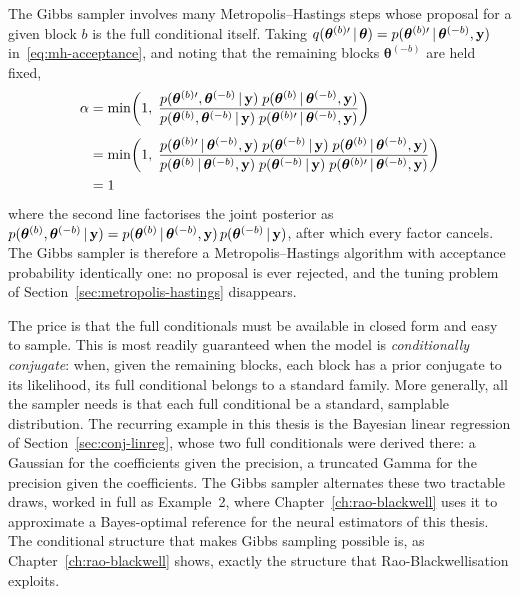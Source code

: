 The Gibbs sampler involves many Metropolis--Hastings steps whose proposal
for a given block $b$ is the full conditional itself. Taking
$q(\bm{\theta}^{(b)\prime} \,|\, \bm{\theta}) =
p(\bm{\theta}^{(b)\prime} \,|\, \bm{\theta}^{(-b)}, \mathbf{y})$
in~\eqref{eq:mh-acceptance}, and noting that the remaining blocks
$\bm{\theta}^{(-b)}$ are held fixed,
%
\begin{align}
  \alpha
  &= \min\!\left(1,\;
     \frac{p(\bm{\theta}^{(b)\prime}, \bm{\theta}^{(-b)} \,|\,
            \mathbf{y})\;
           p(\bm{\theta}^{(b)} \,|\, \bm{\theta}^{(-b)},
            \mathbf{y})}
          {p(\bm{\theta}^{(b)}, \bm{\theta}^{(-b)} \,|\,
            \mathbf{y})\;
           p(\bm{\theta}^{(b)\prime} \,|\, \bm{\theta}^{(-b)},
            \mathbf{y})}
     \right)
     \notag \\[4pt]
  &= \min\!\left(1,\;
     \frac{p(\bm{\theta}^{(b)\prime} \,|\, \bm{\theta}^{(-b)},
            \mathbf{y})\;
           p(\bm{\theta}^{(-b)} \,|\, \mathbf{y})\;
           p(\bm{\theta}^{(b)} \,|\, \bm{\theta}^{(-b)},
            \mathbf{y})}
          {p(\bm{\theta}^{(b)} \,|\, \bm{\theta}^{(-b)},
            \mathbf{y})\;
           p(\bm{\theta}^{(-b)} \,|\, \mathbf{y})\;
           p(\bm{\theta}^{(b)\prime} \,|\, \bm{\theta}^{(-b)},
            \mathbf{y})}
     \right) \\
     &= 1
  \label{eq:gibbs-acceptance}
\end{align}
%
where the second line factorises the joint posterior as
$p(\bm{\theta}^{(b)}, \bm{\theta}^{(-b)} \,|\, \mathbf{y}) =
p(\bm{\theta}^{(b)} \,|\, \bm{\theta}^{(-b)}, \mathbf{y})\,
p(\bm{\theta}^{(-b)} \,|\, \mathbf{y})$, after which every factor
cancels. The Gibbs sampler is therefore a Metropolis--Hastings
algorithm with acceptance probability identically one: no proposal is
ever rejected, and the tuning problem of
Section~\ref{sec:metropolis-hastings} disappears.

The price is that the full conditionals must be available in closed
form and easy to sample. This is most readily guaranteed when the
model is \emph{conditionally conjugate}: when, given the remaining
blocks, each block has a prior conjugate to its likelihood, its full
conditional belongs to a standard family. More generally, all the
sampler needs is that each full conditional be a standard, samplable
distribution. The recurring example in this thesis is the Bayesian
linear regression of Section~\ref{sec:conj-linreg}, whose two full
conditionals were derived there: a Gaussian for the coefficients given
the precision, a truncated Gamma for the precision given the
coefficients. The Gibbs sampler alternates these two tractable draws,
worked in full as Example~2, where Chapter~\ref{ch:rao-blackwell} uses
it to approximate a Bayes-optimal reference for the neural estimators of
this thesis. The conditional
structure that makes Gibbs sampling possible is, as
Chapter~\ref{ch:rao-blackwell} shows, exactly the structure that
Rao-Blackwellisation exploits.

